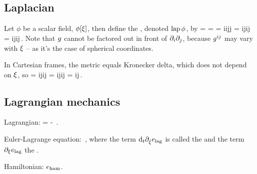 \subsection{Laplacian}
Let $\phi$ be a scalar field, $\phi\!\left[{\xi}\right]$, then define the , denoted $\operatorname{lap}\phi$, by
\beq
\lap\phi = \div\grad\phi
         = \gder\iprod\gder\phi
         = \rbvec i\igd i\iprod\rbvec j\igd j\phi
         = \igd i\igd j\rbvec i\iprod\rbvec j\phi
         = \igd i\igd j\rmet ij\phi\,.
\eeq
Note that $g$ cannot be factored out in front of $\partial_{i}\partial_{j}$, because $g^{{i}{j}}$ may vary with $\xi$ -- as it's the case of spherical coordinates.

In Cartesian frames, the metric equals Kronecker delta, which does not depend on $\xi$, so
\beq
\lap\phi = \igd i\igd j\rmet ij\phi
         = \rkron ij\igd i\igd j\phi
         = \igd i\igd j\phi{}\,.
\eeq


\subsection{Lagrangian mechanics}
Lagrangian:
\beq
\lag = \ken - \pen\,.
\eeq

Euler-Lagrange equation:
\beq
\eleq{\pos}{\dt\pos}\,,
\eeq
where the term $\text{d}_{t}\partial_{\dot{\xi}}e_\text{lag}$ is called the  and the term $\partial_{\xi}e_\text{lag}$ the .

Hamiltonian: $e_\text{ham}$.
